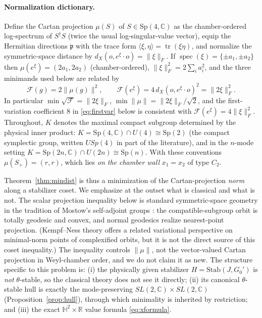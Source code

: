 \documentclass[11pt]{article}
\theoremstyle{definition}
\theoremstyle{remark}
\newcommand{\C}{\mathbb{C}}
\newcommand{\R}{\mathbb{R}}
\newcommand{\Sp}{\mathrm{Sp}}
\newcommand{\Stab}{\mathrm{Stab}}
\newcommand{\tr}{\operatorname{tr}}
\newcommand{\dg}{\dagger}
\begin{document}
\paragraph{Normalization dictionary.}
Define the Cartan projection $\mu(S)$ of $S\in\Sp(4,\C)$ as the
chamber-ordered log-spectrum of $S^{\dg}S$ (twice the usual
log-singular-value vector), equip the Hermitian directions $\mathfrak p$
with the trace form $\langle\xi,\eta\rangle=\tr(\xi\eta)$, and normalize the
symmetric-space distance by $d_X(o,e^{\xi}\!\cdot o)=\|\xi\|_F$.  If
$\operatorname{spec}(\xi)=\{\pm a_1,\pm a_2\}$ then
$\mu(e^{\xi})=(2a_1,2a_2)$ (chamber-ordered), $\|\xi\|_F^2=2\sum_ia_i^2$,
and the three minimands used below are related by
\begin{equation}\label{eq:dictionary}
\boxed{\ \mathcal F(g)=2\|\mu(g)\|^2,
\qquad
\mathcal F(e^{\xi})=4\,d_X(o,e^{\xi}\!\cdot o)^2=\|2\xi\|_F^2 .\ }
\end{equation}
In particular $\min\sqrt{\mathcal F}=\|2\xi\|_F$,
$\min\|\mu\|=\|2\xi\|_F/\sqrt2$, and the first-variation coefficient $8$ in
\eqref{eq:firstvar} below is consistent with
$\mathcal F(e^{\xi})=4\|\xi\|_F^2$.  Throughout, $K$ denotes the
maximal compact subgroup determined by the physical inner product:
$K=\Sp(4,\C)\cap U(4)\cong\Sp(2)$ (the compact symplectic group, written
$USp(4)$ in part of the literature), and in the $n$-mode setting
$K=\Sp(2n,\C)\cap U(2n)\cong\Sp(n)$.  With these conventions
$\mu(S_+)=(r,r)$, which lies \emph{on the chamber wall} $x_1=x_2$ of type
$C_2$.

Theorem~\ref{thm:mindist} is thus a minimization of the Cartan-projection
\emph{norm} along a stabilizer coset.  We emphasize at the outset what is
classical and what is not.  The scalar projection inequality below is
standard symmetric-space geometry in the tradition of Mostow's self-adjoint
groups \cite{Mostow1955,BridsonHaefliger}: the compatible-subgroup orbit is
totally geodesic and convex, and normal geodesics realize nearest-point
projection.  (Kempf--Ness theory \cite{KempfNess1979} offers a related
variational perspective on minimal-norm points of complexified orbits, but
it is not the direct source of this coset inequality.)  The inequality
controls $\|\mu\|$, not the vector-valued Cartan projection in Weyl-chamber
order, and we do not claim it as new.  The structure specific to this
problem is: (i) the physically given stabilizer $H=\Stab(J,G_0')$ is
\emph{not} $\theta$-stable, so the classical theory does not see it
directly; (ii) its canonical $\theta$-stable hull is exactly the
mode-preserving $SL(2,\C)\times SL(2,\C)$
(Proposition~\ref{prop:hull}), through which minimality is inherited by
restriction; and (iii) the exact $\mathbb H^2\times\R$ value formula
\eqref{eq:xformula}.
\end{document}
